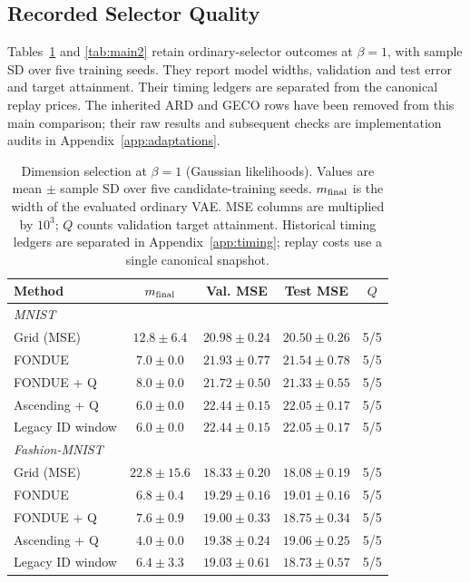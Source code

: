 \documentclass[make,article,submit,pdftex,moreauthors]{Definitions/mdpi}
\begin{document}
\subsection{Recorded Selector Quality}
Tables~\ref{tab:main1} and \ref{tab:main2} retain ordinary-selector
outcomes at $\beta=1$, with sample SD over five training seeds.
They report model widths, validation and test error and target attainment.
Their timing ledgers are separated from the canonical replay prices.
The inherited ARD and GECO rows have been removed from this main
comparison; their raw results and subsequent checks are implementation
audits in Appendix~\ref{app:adaptations}.

\begin{table}[H]
\caption{Dimension selection at $\beta=1$ (Gaussian likelihoods). Values are mean $\pm$ sample SD over five candidate-training seeds. $m_{\rm final}$ is the width of the evaluated ordinary VAE. MSE columns are multiplied by $10^3$; $Q$ counts validation target attainment. Historical timing ledgers are separated in Appendix~\ref{app:timing}; replay costs use a single canonical snapshot.}\label{tab:main1}
\footnotesize
\setlength{\tabcolsep}{3.5pt}
\begin{tabular*}{\textwidth}{@{\extracolsep{\fill}}lcccc@{}}
\toprule
Method & $m_{\rm final}$ & Val. MSE & Test MSE & $Q$ \\
\midrule
\multicolumn{5}{l}{\emph{MNIST}} \\
Grid (MSE) & $12.8 \pm 6.4$ & $20.98 \pm 0.24$ & $20.50 \pm 0.26$ & 5/5 \\
FONDUE & $7.0 \pm 0.0$ & $21.93 \pm 0.77$ & $21.54 \pm 0.78$ & 5/5 \\
FONDUE + Q & $8.0 \pm 0.0$ & $21.72 \pm 0.50$ & $21.33 \pm 0.55$ & 5/5 \\
Ascending + Q & $6.0 \pm 0.0$ & $22.44 \pm 0.15$ & $22.05 \pm 0.17$ & 5/5 \\
Legacy ID window & $6.0 \pm 0.0$ & $22.44 \pm 0.15$ & $22.05 \pm 0.17$ & 5/5 \\
\midrule
\multicolumn{5}{l}{\emph{Fashion-MNIST}} \\
Grid (MSE) & $22.8 \pm 15.6$ & $18.33 \pm 0.20$ & $18.08 \pm 0.19$ & 5/5 \\
FONDUE & $6.8 \pm 0.4$ & $19.29 \pm 0.16$ & $19.01 \pm 0.16$ & 5/5 \\
FONDUE + Q & $7.6 \pm 0.9$ & $19.00 \pm 0.33$ & $18.75 \pm 0.34$ & 5/5 \\
Ascending + Q & $4.0 \pm 0.0$ & $19.38 \pm 0.24$ & $19.06 \pm 0.25$ & 5/5 \\
Legacy ID window & $6.4 \pm 3.3$ & $19.03 \pm 0.61$ & $18.73 \pm 0.57$ & 5/5 \\
\bottomrule
\end{tabular*}
\end{table}
\end{document}
